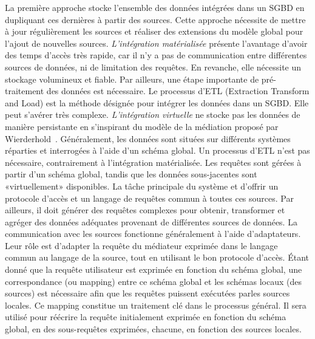 La première approche stocke l'ensemble des données intégrées dans un SGBD en dupliquant ces dernières à partir des sources. Cette approche nécessite de mettre à jour régulièrement les sources et réaliser des extensions du modèle global pour l'ajout de nouvelles sources. \textit{L'intégration matérialisée} présente l'avantage d'avoir des temps d'accès très rapide, car il n'y a pas de communication entre différentes sources de données, ni de limitation des requêtes. En revanche, elle nécessite un stockage volumineux et fiable. Par ailleurs, une étape importante de pré-traitement des données est nécessaire. Le processus d'ETL (Extraction Transform and Load) est la méthode désignée pour intégrer les données dans un SGBD. Elle peut s'avérer très complexe. 
\textit{L'intégration virtuelle} ne stocke pas les données de manière persistante en s'inspirant du modèle de la médiation proposé par Wierderhold~\cite{Wiederhold1995,wiederhold1997}. Généralement, les données sont situées sur différents systèmes réparties et interrogées à l'aide d'un schéma global. Un processus d'ETL n'est pas nécessaire, contrairement à l'intégration matérialisée. Les requêtes sont gérées à partir d'un schéma global, tandis que les données sous-jacentes sont «virtuellement» disponibles. La tâche principale du système et d'offrir un protocole d’accès et un langage de requêtes commun à toutes ces sources. Par ailleurs, il doit générer des requêtes complexes pour obtenir, transformer et agréger des données adéquates provenant de différentes sources de données. La communication avec les sources fonctionne généralement à l'aide d'adaptateurs. Leur rôle est d'adapter la requête du médiateur exprimée dans le langage commun au langage de la source, tout en utilisant le bon protocole d’accès. Étant donné que la requête utilisateur est exprimée en fonction du schéma global, une correspondance (ou mapping) entre ce schéma global et les schémas locaux (des sources) est nécessaire  afin que les requêtes puissent exécutées parles sources locales.  Ce mapping constitue un traitement clé dans le processus général. Il sera utilisé pour réécrire la requête initialement exprimée en fonction du schéma global, en des sous-requêtes exprimées, chacune, en fonction des sources locales.\\


